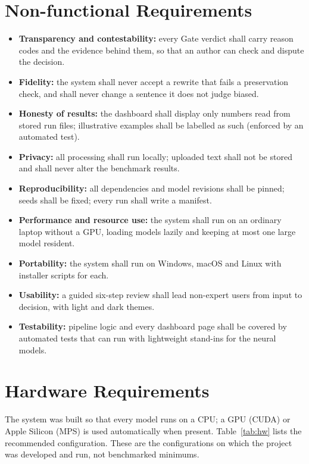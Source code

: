 \documentclass[12pt,a4paper,oneside]{report}
\begin{document}
\section{Non-functional Requirements}
\begin{itemize}
\item \textbf{Transparency and contestability:} every Gate verdict shall carry reason codes and the evidence behind
them, so that an author can check and dispute the decision.
\item \textbf{Fidelity:} the system shall never accept a rewrite that fails a preservation check, and shall never
change a sentence it does not judge biased.
\item \textbf{Honesty of results:} the dashboard shall display only numbers read from stored run files; illustrative
examples shall be labelled as such (enforced by an automated test).
\item \textbf{Privacy:} all processing shall run locally; uploaded text shall not be stored and shall never alter the
benchmark results.
\item \textbf{Reproducibility:} all dependencies and model revisions shall be pinned; seeds shall be fixed; every run
shall write a manifest.
\item \textbf{Performance and resource use:} the system shall run on an ordinary laptop without a GPU, loading models
lazily and keeping at most one large model resident.
\item \textbf{Portability:} the system shall run on Windows, macOS and Linux with installer scripts for each.
\item \textbf{Usability:} a guided six-step review shall lead non-expert users from input to decision, with light and
dark themes.
\item \textbf{Testability:} pipeline logic and every dashboard page shall be covered by automated tests that can run
with lightweight stand-ins for the neural models.
\end{itemize}

\section{Hardware Requirements}
The system was built so that every model runs on a CPU; a GPU (CUDA) or Apple Silicon (MPS) is used automatically when
present. Table~\ref{tab:hw} lists the recommended configuration. These are the configurations on which the project was
developed and run, not benchmarked minimums.
\end{document}
